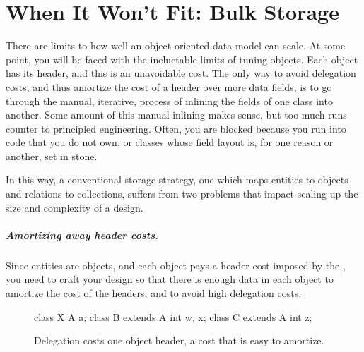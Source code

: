 
\chapter{When It Won't Fit: Bulk Storage}
\label{chapter:large-long-lived}

There are limits to how well an object-oriented data model can scale.
At some point, you will be faced with the ineluctable limits of tuning objects.
Each object has its header, and this is an unavoidable cost. The only way to
avoid delegation costs, and thus amortize the cost of a header over more data
fields, is to go through the manual, iterative, process of inlining the fields
of one class into another. Some amount of this manual inlining makes sense, but
too much runs counter to principled engineering. Often, you are blocked because
you run into code that you do not own, or classes whose field layout is,
for one reason or another, set in stone.

In this way, a conventional storage strategy, one which maps entities to objects
and relations to collections, suffers from two problems that impact scaling up
the size and complexity of a design.

\paragraph{Amortizing away header costs.} Since entities are
  objects, and each object pays a header cost imposed by the \jre, you need to
  craft your design so that there is enough data in each object to amortize the
  cost of the headers, and to avoid high delegation costs.
 
\begin{figure}
 \centering
 \vspace{-2mm}
 \begin{framedlisting}
 class X {
   A a;
 }
 class B extends A {
   int w, x;
 }
 class C extends A {
   int z;
 }
 \end{framedlisting}
 \caption{Delegation costs one object header, a cost that is easy to amortize.} 
 \label{fig:fragile-base-class}
\end{figure}
